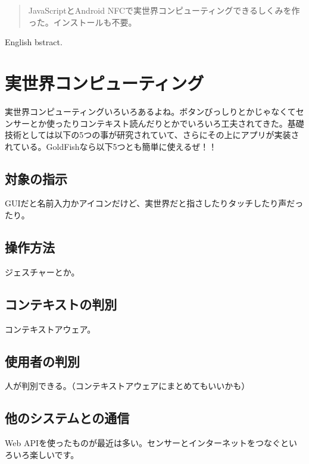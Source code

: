 
\begin{abstract}
JavaScriptとAndroid NFCで実世界コンピューティングできるしくみを作った。インストールも不要。
\end{abstract}

\begin{eabstract}
English bstract.
\end{eabstract}

\maketitle

\section{実世界コンピューティング}\label{sec:Introduction}
実世界コンピューティングいろいろあるよね。ボタンびっしりとかじゃなくてセンサーとか使ったりコンテキスト読んだりとかでいろいろ工夫されてきた。基礎技術としては以下の5つの事が研究されていて、さらにその上にアプリが実装されている。GoldFishなら以下5つとも簡単に使えるぜ！！

\subsection{対象の指示}
GUIだと名前入力かアイコンだけど、実世界だと指さしたりタッチしたり声だったり。

\subsection{操作方法}
ジェスチャーとか。

\subsection{コンテキストの判別}
コンテキストアウェア。

\subsection{使用者の判別}
人が判別できる。（コンテキストアウェアにまとめてもいいかも）

\subsection{他のシステムとの通信}
Web APIを使ったものが最近は多い。センサーとインターネットをつなぐといろいろ楽しいです。

